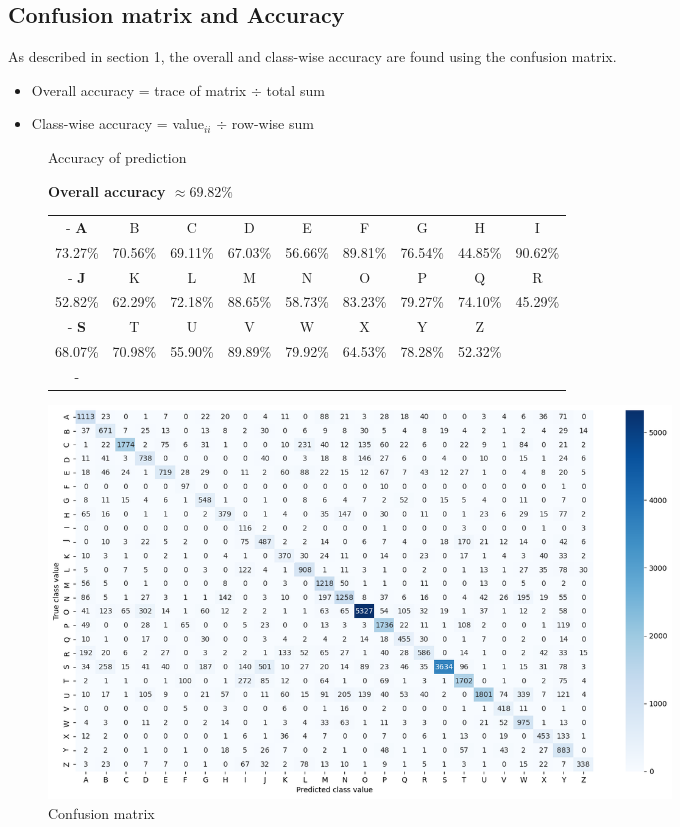 \subsection{Confusion matrix and Accuracy}
As described in section 1, the overall and class-wise accuracy are found using the confusion matrix.
\begin{itemize}[nosep]
	\item Overall accuracy = trace of matrix $\div$ total sum
	\item Class-wise accuracy = value$_{ii}$ $\div$ row-wise sum
\end{itemize}
\begin{figure}[h]
	\centering
	\small
	\caption{Accuracy of prediction}\par
	\textbf{Overall accuracy $\approx 69.82\%$}\par\medskip
	\begin{tabu}{|c|c|c |c|c|c |c|c|c |}
		\tabucline-\rowfont\bfseries
		A        &  B      &  C      &  D      &  E      &  F      &  G      &  H      &  I     \\
		73.27\%  & 70.56\% & 69.11\% & 67.03\% & 56.66\% & 89.81\% & 76.54\% & 44.85\% & 90.62\%\\
		\tabucline-\rowfont\bfseries
		J       &  K      &  L      &  M      &  N      &  O      &  P      &  Q      &  R      \\
		52.82\% & 62.29\% & 72.18\% & 88.65\% & 58.73\% & 83.23\% & 79.27\% & 74.10\% & 45.29\%  \\
		\tabucline-\rowfont\bfseries
		S       &  T      &  U      &  V      &  W      &  X      &  Y      &  Z      & \\
		68.07\% & 70.98\% & 55.90\% & 89.89\% & 79.92\% & 64.53\% & 78.28\% & 52.32\% & \\
		\tabucline-
	\end{tabu}
	\par\bigskip
	\caption{Confusion matrix}\par
	\includegraphics[width=0.8\textwidth]{fig/confusion}
\end{figure}

